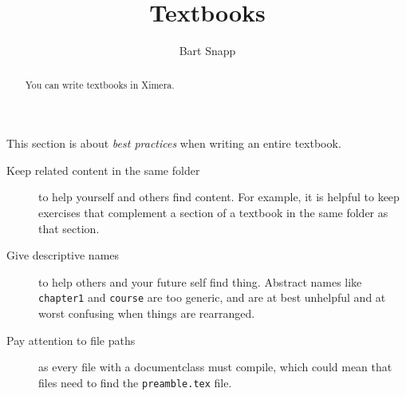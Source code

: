 \documentclass{ximera}
\title{Textbooks}
\author{Bart Snapp}
\begin{document}
\begin{abstract}
  You can write textbooks in Ximera.
\end{abstract}
\maketitle
This section is about \textit{best practices} when writing an entire
textbook.
\begin{description}
  \item[Keep related content in the same folder] to help yourself and
    others find content. For example, it is helpful to keep exercises that
    complement a section of a textbook in the same folder as that section.
  \item[Give descriptive names] to help others and your future self find thing.
    Abstract names like \verb!chapter1! and \verb!course! are too generic, and
    are
    at best unhelpful and at worst confusing when things are rearranged.
  \item[Pay attention to file paths] as every file with a documentclass must
    compile, which could mean that files need to find the \verb!preamble.tex! file.
\end{description}

\pdfOnly{\end{multicols}}
\end{document}
